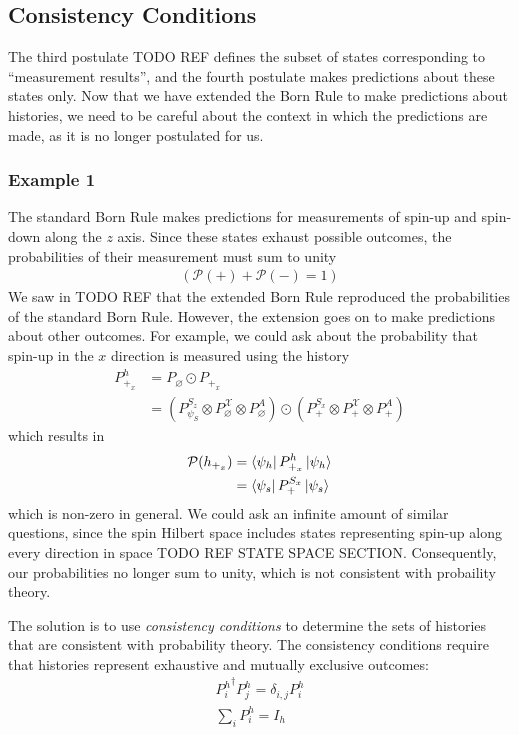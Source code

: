 \subsection{Consistency Conditions}

The third postulate TODO REF defines the subset of states corresponding to ``measurement results'', and the fourth postulate makes predictions about these states only. Now that we have extended the Born Rule to make predictions about histories, we need to be careful about the context in which the predictions are made, as it is no longer postulated for us.

\subsubsection{Example 1}

The standard Born Rule makes predictions for measurements of spin-up and spin-down along the $z$ axis. Since these states exhaust possible outcomes, the probabilities of their measurement must sum to unity
\begin{align}
\left( \mathcal{P}(+) + \mathcal{P}(-) = 1 \right)
\end{align}
We saw in TODO REF that the extended Born Rule reproduced the probabilities of the standard Born Rule. However, the extension goes on to make predictions about other outcomes. For example, we could ask about the probability that spin-up in the $x$ direction is measured using the history
\begin{align}
  P^h_{+_x} &= P_\varnothing \odot P_{+_x} \\ \nonumber
  &= \left(P^{S_z}_{\psi_S} \otimes P^\mathcal{X}_\varnothing \otimes P^A_\varnothing \right) \odot \left(P^{S_x}_+ \otimes P^\mathcal{X}_+ \otimes P^A_+ \right)
\end{align}
which results in
\begin{align}
  \mathcal{P}(h_{+_x}) &= \bra{\psi_h} P^h_{+_x} \ket{\psi_h}  \\ \nonumber
  &= \bra{\psi_s} P^{S_x}_+ \ket{\psi_s}
\end{align}
which is non-zero in general. We could ask an infinite amount of similar questions, since the spin Hilbert space includes states representing spin-up along every direction in space TODO REF STATE SPACE SECTION. Consequently, our probabilities no longer sum to unity, which is not consistent with probaility theory.

The solution is to use \textit{consistency conditions} to determine the sets of histories that are consistent with probability theory. The consistency conditions require that histories represent exhaustive and mutually exclusive outcomes:
\begin{align}
  {P^h_i}^\dagger P^h_j = \delta_{i,j} P^h_i \\
  \sum_i P^h_i = I_h
\end{align}

